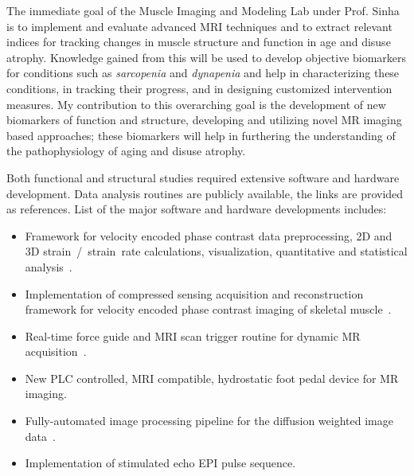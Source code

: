 The immediate goal of the Muscle Imaging and Modeling Lab under Prof. Sinha is to implement and evaluate advanced MRI techniques and to extract relevant indices for tracking changes in muscle structure and function in age and disuse atrophy. 
Knowledge gained from this will be used to develop objective biomarkers for conditions such as \textit{sarcopenia} and \textit{dynapenia} and help in characterizing these conditions, in tracking their progress, and in designing customized intervention measures. 
My contribution to this overarching goal is the development of new biomarkers of function and structure, developing and utilizing novel MR imaging based approaches; 	these biomarkers will help in furthering the understanding of the pathophysiology of aging and disuse atrophy.

Both functional and structural studies required extensive software and hardware development. Data analysis routines are publicly available, the links are provided as references. List of the major software and hardware developments includes:
\begin{itemize}
\item Framework for velocity encoded phase contrast data preprocessing, 2D and 3D strain~/~strain~rate calculations, visualization, quantitative and statistical analysis~\cite{2DSR, 3DSR}.
\item Implementation of compressed sensing acquisition and reconstruction framework for velocity encoded phase contrast imaging of skeletal muscle~\cite{3DSR}.
\item Real-time force guide and MRI scan trigger routine for dynamic MR acquisition~\cite{LabView}.
\item New PLC controlled, MRI compatible, hydrostatic foot pedal device for MR imaging.
\item Fully-automated image processing pipeline for the diffusion weighted image data~\cite{DTI}.
\item Implementation of stimulated echo EPI pulse sequence.
\end{itemize}